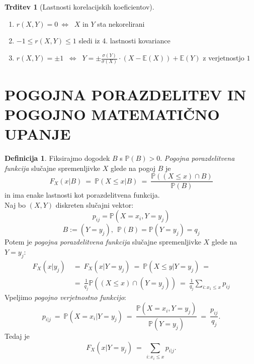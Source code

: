 \documentclass[11pt]{article}
\theoremstyle{definition}
\newtheorem{definicija}{Definicija}[section]
\theoremstyle{definition}
\newtheorem{trditev}{Trditev}[section]
\theoremstyle{definition}
\begin{document}
\begin{trditev}[Lastnosti korelacijskih koeficientov]
~\\
\begin{enumerate}
	\item $r(X,Y) = 0 ~\Leftrightarrow~$ $X$ in $Y$ sta nekorelirani
	\item $-1 \leq r(X,Y) \leq 1$ sledi iz 4. lastnosti kovariance
	\item $r(X,Y) = \pm 1$ $~\Leftrightarrow~$ $Y = \pm \frac{\sigma(Y)}{\sigma(X)} \cdot (X - \mathbb{E}(X)) + \mathbb{E}(Y)$ z verjetnostjo $1$
\end{enumerate}
\end{trditev}
\vspace{0.5cm}

\pagebreak


\section{POGOJNA PORAZDELITEV IN POGOJNO MATEMATIČNO UPANJE}
\vspace{0.5cm}

\begin{definicija}

Fiksirajmo dogodek $B$ s $\mathbb{P}(B) > 0$. \textit{Pogojna porazdelitvena funkcija} slučajne spremenljivke $X$ glede na pogoj $B$ je
$$F_X(x | B) ~=~ \mathbb{P}(X \leq x | B) ~=~ \frac{\mathbb{P}((X \leq x) \cap B)}{\mathbb{P}(B)}$$
in ima enake lastnosti kot porazdelitvena funkcija. \\

\noindent Naj bo $(X, Y)$ diskreten slučajni vektor: 
$$p_{ij} =  \mathbb{P}(X = x_i, Y = y_j)$$
$$B := (Y = y_j), ~~\mathbb{P}(B) = \mathbb{P}(Y = y_j) = q_j$$
Potem je \textit{pogojna porazdelitvena funkcija} slučajne spremenljivke $X$ glede na $Y = y_j$:
\begin{align*}
	F_X(x | y_j) ~&=~ F_X(x | Y = y_j) ~=~ \mathbb{P}(X \leq y |Y = y_j) ~= \\
	&=~ \frac{1}{q_j} \mathbb{P}((X \leq x) \cap (Y = y_j)) ~=~ \frac{1}{q_j} \sum_{i: x_1 \leq x} p_{ij}
\end{align*}
Vpeljimo  \textit{pogojno verjetnostno funkcijo}:
$$p_{i|j} ~=~ \mathbb{P}(X = x_i | Y = y_j) ~=~ \frac{\mathbb{P}(X = x_i, Y = y_j)}{\mathbb{P}(Y = y_j)} ~=~ \frac{p_{ij}}{q_j}.$$
Tedaj je 
$$F_X(x | Y = y_j) ~=~ \sum_{i: x_i \leq x} p_{i|j}.$$

\end{definicija}
\vspace{0.5cm}
\end{document}
